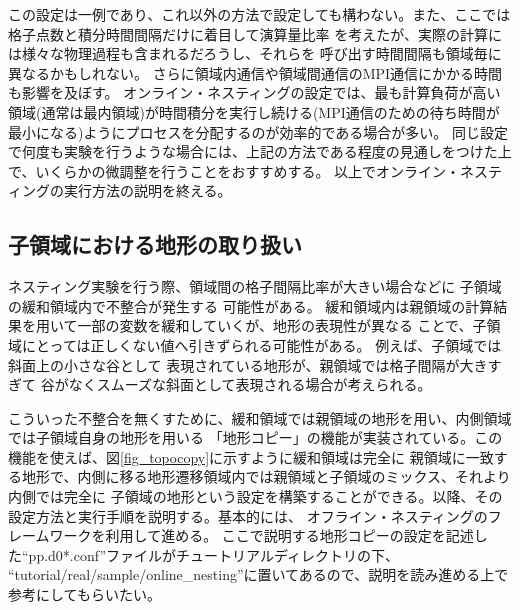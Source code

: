 この設定は一例であり、これ以外の方法で設定しても構わない。また、ここでは格子点数と積分時間間隔だけに着目して演算量比率
を考えたが、実際の計算には様々な物理過程も含まれるだろうし、それらを 呼び出す時間間隔も領域毎に異なるかもしれない。
さらに領域内通信や領域間通信のMPI通信にかかる時間も影響を及ぼす。
オンライン・ネスティングの設定では、最も計算負荷が高い領域(通常は最内領域)が時間積分を実行し続ける(MPI通信のための待ち時間が最小になる)ようにプロセスを分配するのが効率的である場合が多い。
同じ設定で何度も実験を行うような場合には、上記の方法である程度の見通しをつけた上で、いくらかの微調整を行うことをおすすめする。
以上でオンライン・ネスティングの実行方法の説明を終える。


\subsection{子領域における地形の取り扱い} \label{sec:nest_topo}
ネスティング実験を行う際、領域間の格子間隔比率が大きい場合などに
子領域の緩和領域内で不整合が発生する
可能性がある。
緩和領域内は親領域の計算結果を用いて一部の変数を緩和していくが、地形の表現性が異なる
ことで、子領域にとっては正しくない値へ引きずられる可能性がある。
例えば、子領域では斜面上の小さな谷として
表現されている地形が、親領域では格子間隔が大きすぎて
谷がなくスムーズな斜面として表現される場合が考えられる。

こういった不整合を無くすために、緩和領域では親領域の地形を用い、内側領域では子領域自身の地形を用いる
「地形コピー」の機能が実装されている。この機能を使えば、図\ref{fig_topocopy}に示すように緩和領域は完全に
親領域に一致する地形で、内側に移る地形遷移領域内では親領域と子領域のミックス、それより内側では完全に
子領域の地形という設定を構築することができる。以降、その設定方法と実行手順を説明する。基本的には、
オフライン・ネスティングのフレームワークを利用して進める。
ここで説明する地形コピーの設定を記述した``pp.d0*.conf''ファイルがチュートリアルディレクトリの下、
``tutorial/real/sample/online\_nesting''に置いてあるので、説明を読み進める上で参考にしてもらいたい。

